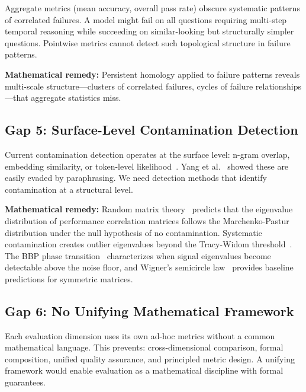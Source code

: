 \documentclass[11pt]{article}
\begin{document}
Aggregate metrics (mean accuracy, overall pass rate) obscure systematic patterns of correlated failures. A model might fail on all questions requiring multi-step temporal reasoning while succeeding on similar-looking but structurally simpler questions. Pointwise metrics cannot detect such topological structure in failure patterns.

\textbf{Mathematical remedy:} Persistent homology applied to failure patterns reveals multi-scale structure---clusters of correlated failures, cycles of failure relationships---that aggregate statistics miss.

\subsection{Gap 5: Surface-Level Contamination Detection}

Current contamination detection operates at the surface level: n-gram overlap, embedding similarity, or token-level likelihood~\cite{shi2023detecting}. Yang et al.~\cite{yang2023rethinking} showed these are easily evaded by paraphrasing. We need detection methods that identify contamination at a structural level.

\textbf{Mathematical remedy:} Random matrix theory~\cite{martin2018implicit,marchenkopastur1967} predicts that the eigenvalue distribution of performance correlation matrices follows the Marchenko-Pastur distribution under the null hypothesis of no contamination. Systematic contamination creates outlier eigenvalues beyond the Tracy-Widom threshold~\cite{tracy1996orthogonal}. The BBP phase transition~\cite{baik2005phase} characterizes when signal eigenvalues become detectable above the noise floor, and Wigner's semicircle law~\cite{wigner1955characteristic} provides baseline predictions for symmetric matrices.

\subsection{Gap 6: No Unifying Mathematical Framework}

Each evaluation dimension uses its own ad-hoc metrics without a common mathematical language. This prevents: cross-dimensional comparison, formal composition, unified quality assurance, and principled metric design. A unifying framework would enable evaluation as a mathematical discipline with formal guarantees.


\end{document}
